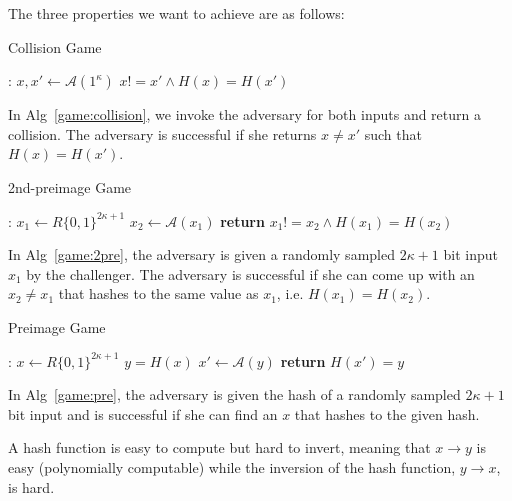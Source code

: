 The three properties we want to achieve are as follows:


\begin{algorithm}[H]
\caption{Collision Game}
\label{game:collision}
\begin{algorithmic}[1]
: \State $x, x' \leftarrow \mathcal{A}
(1^{\kappa})$    
\State \Return $x != x' \wedge H(x) = H(x')$
\EndFunction
\end{algorithmic}
\end{algorithm}

In Alg~\ref{game:collision}, we invoke the adversary for both inputs and return a collision. The adversary is successful if she returns $x\ne x'$ such that $H(x)=H(x')$.

\begin{algorithm}[H]
\caption{2nd-preimage Game}
\label{game:2pre}
\begin{algorithmic}[1]
:   \Comment{}
    \State $x_1 \leftarrow R \{0,1\}^{2\kappa+1}$
    \State $x_2 \leftarrow \mathcal{A}(x_1)$
    \State \textbf{return} $x_1 != x_2 \wedge H(x_1) = H(x_2)$
    \EndFunction
\end{algorithmic}
\end{algorithm}

In Alg~\ref{game:2pre}, the adversary is given a randomly sampled $2\kappa+1$ bit input $x_1$ by the challenger. The adversary is successful if she can come up with an $x_2 \neq x_1$ that hashes to the same value as $x_1$, i.e. $H(x_1) = H(x_2)$.

\begin{algorithm}[H]
\caption{Preimage Game}
\label{game:pre}
\begin{algorithmic}[1]
:       \Comment{}
    \State $x \leftarrow R \{0,1\}^{2\kappa+1}$
    \State $y = H(x)$    \State $x' \leftarrow \mathcal{A}(y)$ 
    \State \textbf{return} $H(x') = y$
    \EndFunction
\end{algorithmic}
\end{algorithm}

In Alg~\ref{game:pre}, the adversary is given the hash of a randomly sampled $2\kappa+1$ bit input and is successful if she can find an $x$ that hashes to the given hash.

A hash function is easy to compute but hard to invert, meaning that $x \rightarrow y$ is easy (polynomially computable) while the inversion of the hash function, $y \rightarrow x$, is hard.

